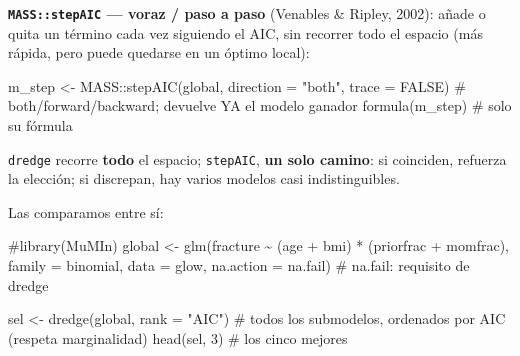 \documentclass[
  letterpaper,
  DIV=11,
  numbers=noendperiod]{scrartcl}
\newenvironment{Shaded}{\begin{snugshade}}{\end{snugshade}}
\newcommand{\AttributeTok}[1]{\textcolor[rgb]{0.40,0.45,0.13}{#1}}
\newcommand{\CommentTok}[1]{\textcolor[rgb]{0.37,0.37,0.37}{#1}}
\newcommand{\ConstantTok}[1]{\textcolor[rgb]{0.56,0.35,0.01}{#1}}
\newcommand{\DecValTok}[1]{\textcolor[rgb]{0.68,0.00,0.00}{#1}}
\newcommand{\FunctionTok}[1]{\textcolor[rgb]{0.28,0.35,0.67}{#1}}
\newcommand{\NormalTok}[1]{\textcolor[rgb]{0.00,0.23,0.31}{#1}}
\newcommand{\OtherTok}[1]{\textcolor[rgb]{0.00,0.23,0.31}{#1}}
\newcommand{\SpecialCharTok}[1]{\textcolor[rgb]{0.37,0.37,0.37}{#1}}
\newcommand{\StringTok}[1]{\textcolor[rgb]{0.13,0.47,0.30}{#1}}
\begin{document}
\begin{tcolorbox}
\textbf{\texttt{MASS::stepAIC} --- voraz / paso a paso} (Venables \&
Ripley, 2002): añade o quita un término cada vez siguiendo el AIC, sin
recorrer todo el espacio (más rápida, pero puede quedarse en un óptimo
local):

\begin{Shaded}
\begin{Highlighting}[]
\NormalTok{m\_step }\OtherTok{\textless{}{-}}\NormalTok{ MASS}\SpecialCharTok{::}\FunctionTok{stepAIC}\NormalTok{(global, }\AttributeTok{direction =} \StringTok{"both"}\NormalTok{, }\AttributeTok{trace =} \ConstantTok{FALSE}\NormalTok{)  }\CommentTok{\# \textquotesingle{}both\textquotesingle{}/\textquotesingle{}forward\textquotesingle{}/\textquotesingle{}backward\textquotesingle{}; devuelve YA el modelo ganador}
\FunctionTok{formula}\NormalTok{(m\_step)                                                     }\CommentTok{\# solo su fórmula}
\end{Highlighting}
\end{Shaded}

\texttt{dredge} recorre \textbf{todo} el espacio; \texttt{stepAIC},
\textbf{un solo camino}: si coinciden, refuerza la elección; si
discrepan, hay varios modelos casi indistinguibles.

\end{tcolorbox}

Las comparamos entre sí:

\begin{Shaded}
\begin{Highlighting}[]
\CommentTok{\#library(MuMIn)}
\NormalTok{global }\OtherTok{\textless{}{-}} \FunctionTok{glm}\NormalTok{(fracture }\SpecialCharTok{\textasciitilde{}}\NormalTok{ (age }\SpecialCharTok{+}\NormalTok{ bmi) }\SpecialCharTok{*}\NormalTok{ (priorfrac }\SpecialCharTok{+}\NormalTok{ momfrac),}
              \AttributeTok{family =}\NormalTok{ binomial, }\AttributeTok{data =}\NormalTok{ glow, }\AttributeTok{na.action =}\NormalTok{ na.fail)  }\CommentTok{\# na.fail: requisito de dredge}

\NormalTok{sel }\OtherTok{\textless{}{-}} \FunctionTok{dredge}\NormalTok{(global, }\AttributeTok{rank =} \StringTok{"AIC"}\NormalTok{)       }\CommentTok{\# todos los submodelos, ordenados por AIC (respeta marginalidad)}
\FunctionTok{head}\NormalTok{(sel, }\DecValTok{3}\NormalTok{)                              }\CommentTok{\# los cinco mejores}
\end{Highlighting}
\end{Shaded}
\end{document}
